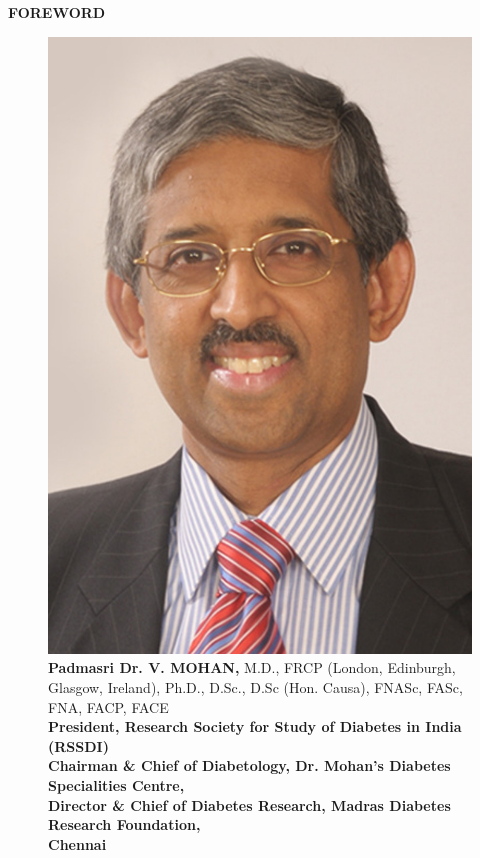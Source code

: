 \thispagestyle{empty}


\begin{center}
\Huge\textbf{FOREWORD}
\end{center}

\vskip 10pt

\begin{figure}[h]
\centering
\includegraphics[scale=.9]{images/001.jpg}\\
\textbf{Padmasri Dr. V. MOHAN,} {\small M.D., FRCP (London, Edinburgh,\\ Glasgow, Ireland), Ph.D., D.Sc., D.Sc (Hon. Causa), FNASc, FASc,\\ FNA, FACP, FACE\\\textbf{President, Research Society for Study of Diabetes in India\\ (RSSDI)\\ Chairman \& Chief of Diabetology, Dr. Mohan’s Diabetes\\ Specialities Centre,\\ Director \& Chief of Diabetes Research, Madras Diabetes\\ Research Foundation,\\ Chennai}}
\end{figure}

